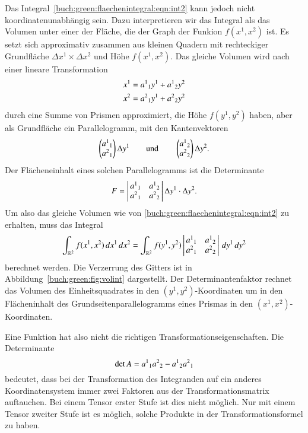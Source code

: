 Das Integral~\eqref{buch:green:flaechenintegral:eqn:int2} kann jedoch
nicht koordinatenunabhängig sein.
%
Dazu interpretieren wir das Integral als das Volumen unter einer der 
Fläche, die der Graph der Funkion $f(x^1,x^2)$ ist.
Es setzt sich approximativ zusammen aus kleinen Quadern mit
rechteckiger Grundfläche $\Delta x^1 \times \Delta x^2$ und Höhe
$f(x^1,x^2)$.
Das gleiche Volumen wird nach einer lineare Transformation 
\[
\begin{aligned}
x^1 &= a^1\mathstrut_1 y^1 + a^1\mathstrut_2 y^2 \\
x^2 &= a^2\mathstrut_1 y^1 + a^2\mathstrut_2 y^2 
\end{aligned}
\]
durch eine Summe von Prismen approximiert, die Höhe $f(y^1,y^2)$ haben,
%
aber als Grundfläche ein Parallelogramm, mit den Kantenvektoren
\[
\begin{pmatrix}
a^1\mathstrut_1\\
a^2\mathstrut_1
\end{pmatrix}
\Delta y^1
\qquad\text{und}\qquad
\begin{pmatrix}
a^1\mathstrut_2\\
a^2\mathstrut_2
\end{pmatrix}
\Delta y^2.
\]
Der Flächeneinhalt eines solchen Parallelogramms ist die Determinante
\[
F
=
\left|\,
\begin{matrix}
a^1\mathstrut_1 & a^1\mathstrut_2 \\
a^2\mathstrut_1 & a^2\mathstrut_2
\end{matrix}
\,\right|
\Delta y^1\cdot \Delta y^2.
\]
Um also das gleiche Volumen wie von
\eqref{buch:green:flaechenintegral:eqn:int2}
zu erhalten, muss das Integral
\[
\int_{\mathbb{R}^2}
f(x^1,x^2)
\,dx^1\,dx^2
=
\int_{\mathbb{R}^2}
f(y^1,y^2)
\left|\,
\begin{matrix}
a^1\mathstrut_1 & a^1\mathstrut_2 \\
a^2\mathstrut_1 & a^2\mathstrut_2
\end{matrix}
\,\right|
\,dy^1\,dy^2
\]
berechnet werden.
Die Verzerrung des Gitters ist in Abbildung~\ref{buch:green:fig:volint}
dargestellt.
Der Determinantenfaktor rechnet das Volumen des Einheitsquadrates in den
$(y^1,y^2)$-Koordinaten um in den Flächeninhalt des Grundseitenparallelogramms
eines Prismas in den $(x^1,x^2)$-Koordinaten.

Eine Funktion hat also nicht die richtigen Transformationseigenschaften.
Die Determinante
\[
\det A
=
a^1\mathstrut_1
a^2\mathstrut_2
-
a^1\mathstrut_2
a^2\mathstrut_1
\]
bedeutet, dass bei der Transformation des Integranden auf ein anderes
Koordinatensystem immer zwei Faktoren aus der
Transformationsmatrix auftauchen.
Bei einem Tensor erster Stufe ist dies nicht möglich.
Nur mit einem Tensor zweiter Stufe ist es möglich, solche Produkte 
in der Transformationsformel zu haben.

